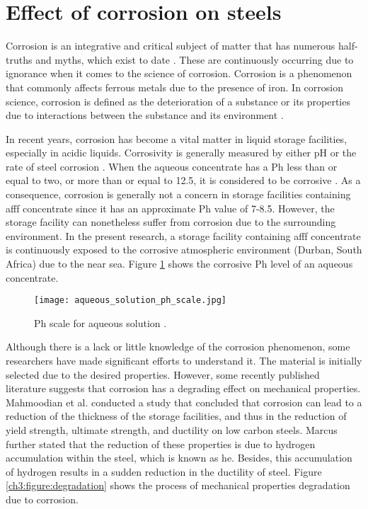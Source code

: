 \section{Effect of corrosion on steels}
\label{ch3:anchor:section:effects}
Corrosion is an integrative and critical subject of matter that has numerous half-truths and myths, which exist to date \cite{mcarthur2004engineering}. These are continuously occurring due to ignorance when it comes to the science of corrosion.  Corrosion is a phenomenon that commonly affects ferrous metals due to the presence of iron. In corrosion science, corrosion is defined as the deterioration of a substance or its properties due to interactions between the substance and its environment \cite{chigondo2016recent}.

In recent years, corrosion has become a vital matter in liquid storage facilities, especially in acidic liquids. Corrosivity is generally measured by either pH or the rate of steel corrosion \cite{marzorati2018green}. When the aqueous concentrate has a Ph less than or equal to two, or more than or equal to 12.5, it is considered to be corrosive \cite{marzorati2018green}. As a consequence, corrosion is generally not a concern in storage facilities containing \acrshort{afff} concentrate since it has an approximate Ph value of 7-8.5. However, the storage facility can nonetheless suffer from corrosion due to the surrounding environment. In the present research, a storage facility containing \acrshort{afff} concentrate is continuously exposed to the corrosive atmospheric environment (Durban, South Africa) due to the near sea. Figure \ref{ch3:figure:ph} shows the corrosive Ph level of an aqueous concentrate.
 
\begin{figure}[H]
    \centering
    \texttt{[image: aqueous\_solution\_ph\_scale.jpg]}
    \caption{Ph scale for aqueous solution \cite{marzorati2018green}.}
    \label{ch3:figure:ph}
\end{figure}

Although there is a lack or little knowledge of the corrosion phenomenon, some researchers have made significant efforts to understand it. The material is initially selected due to the desired properties. However, some recently published literature suggests that corrosion has a degrading effect on mechanical properties. Mahmoodian et al. \cite{li2018effect} conducted a study that concluded that corrosion can lead to a reduction of the thickness of the storage facilities, and thus in the reduction of yield strength, ultimate strength, and ductility on low carbon steels.  Marcus \cite{protopopoff2011surface} further stated that the reduction of these properties is due to hydrogen accumulation within the steel, which is known as \acrfull{he}. Besides, this accumulation of hydrogen results in a sudden reduction in the ductility of steel. Figure \ref{ch3:figure:degradation} shows the process of mechanical properties degradation due to corrosion.
 
